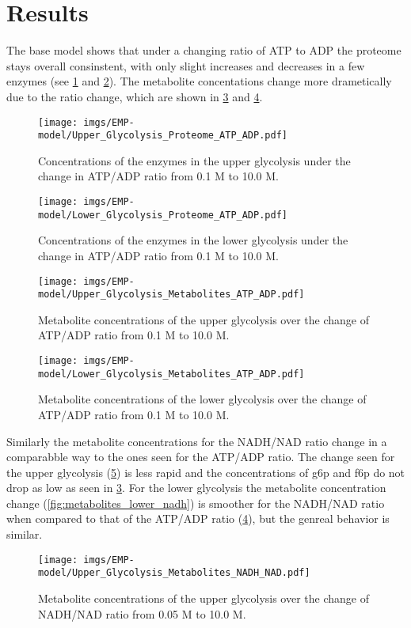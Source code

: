 \section{Results}
The base model shows that under a changing ratio of ATP to ADP the proteome stays overall consinstent, with only slight increases and decreases in a few enzymes (see \ref{fig:proteome_upper_atp} and \ref{fig:proteome_lower_atp}). The metabolite concentations change more drametically due to the ratio change, which are shown in \ref{fig:metabolites_upper_atp} and \ref{fig:metabolites_lower_atp}. 
\begin{figure}[H]
    \centering
    \texttt{[image: imgs/EMP-model/Upper\_Glycolysis\_Proteome\_ATP\_ADP.pdf]}
    \caption{Concentrations of the enzymes in the upper glycolysis under the change in ATP/ADP ratio from 0.1 M to 10.0 M.}
    \label{fig:proteome_upper_atp}
\end{figure}

\begin{figure}[H]
    \centering
    \texttt{[image: imgs/EMP-model/Lower\_Glycolysis\_Proteome\_ATP\_ADP.pdf]}
    \caption{Concentrations of the enzymes in the lower glycolysis under the change in ATP/ADP ratio from 0.1 M to 10.0 M.}
    \label{fig:proteome_lower_atp}
\end{figure}

\begin{figure}[H]
    \centering
    \texttt{[image: imgs/EMP-model/Upper\_Glycolysis\_Metabolites\_ATP\_ADP.pdf]}
    \caption{Metabolite concentrations of the upper glycolysis over the change of ATP/ADP ratio from 0.1 M to 10.0 M.}
    \label{fig:metabolites_upper_atp}
\end{figure}

\begin{figure}[H]
    \centering
    \texttt{[image: imgs/EMP-model/Lower\_Glycolysis\_Metabolites\_ATP\_ADP.pdf]}
    \caption{Metabolite concentrations of the lower glycolysis over the change of ATP/ADP ratio from 0.1 M to 10.0 M.}
    \label{fig:metabolites_lower_atp}
\end{figure}

Similarly the metabolite concentrations for the NADH/NAD ratio change in a comparabble way to the ones seen for the ATP/ADP ratio. The change seen for the upper glycolysis (\ref{fig:metabolites_upper_nadh}) is less rapid and the concentrations of g6p and f6p do not drop as low as seen in \ref{fig:metabolites_upper_atp}. For the lower glycolysis the metabolite concentration change (\ref{fig:metabolites_lower_nadh}) is smoother for the NADH/NAD ratio when compared to that of the ATP/ADP ratio (\ref{fig:metabolites_lower_atp}), but the genreal behavior is similar.
\begin{figure}[H]
    \centering
    \texttt{[image: imgs/EMP-model/Upper\_Glycolysis\_Metabolites\_NADH\_NAD.pdf]}
    \caption{Metabolite concentrations of the upper glycolysis over the change of NADH/NAD ratio from 0.05 M to 10.0 M.}
    \label{fig:metabolites_upper_nadh}
\end{figure}

